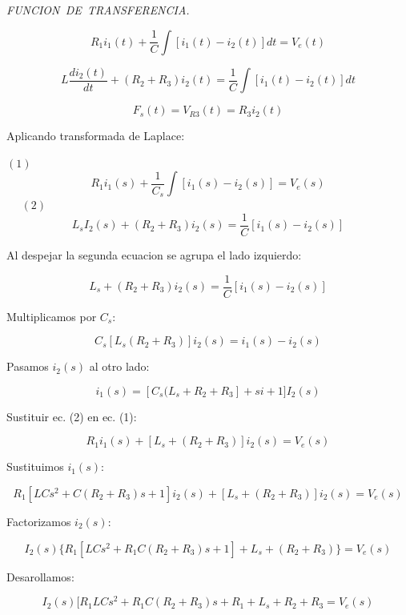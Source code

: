 \documentclass{article}
\begin{document}
\emph{FUNCION\ DE\ TRANSFERENCIA.}

\[
R_{1}i_{1}\left( t\right) +\frac{1}{C}\int \left[ i_{1}\left( t\right)
-i_{2}\left( t\right) \right] dt=V_{e}\left( t\right) 
\]

\[
L\frac{di_{2}\left( t\right) }{dt}+\left( R_{2}+R_{3}\right) i_{2}\left(
t\right) =\frac{1}{C}\int \left[ i_{1}\left( t\right) -i_{2}\left( t\right) %
\right] dt 
\]

\[
F_{s}\left( t\right) =V_{R3}\left( t\right) =R_{3}i_{2}\left( t\right) 
\]

\bigskip Aplicando transformada de Laplace:

$\left( 1\right) $%
\[
R_{1}i_{1}\left( s\right) +\frac{1}{C_{s}}\int \left[ i_{1}\left( s\right)
-i_{2}\left( s\right) \right] =V_{e}\left( s\right) 
\]
$\ \ \ \ \ \ \left( 2\right) $%
\[
L_{s}I_{2}\left( s\right) +\left( R_{2}+R_{3}\right) i_{2}\left( s\right) =%
\frac{1}{C}\left[ i_{1}\left( s\right) -i_{2}\left( s\right) \right] 
\]

Al despejar la segunda ecuacion se agrupa el lado izquierdo:

\[
L_{s}+\left( R_{2}+R_{3}\right) i_{2}\left( s\right) =\frac{1}{C}\left[
i_{1}\left( s\right) -i_{2}\left( s\right) \right] 
\]

Multiplicamos por $C_{s}:$

\[
C_{s}[L_{s}\left( R_{2}+R_{3}\right) ]i_{2}\left( s\right) =i_{1}\left(
s\right) -i_{2}\left( s\right) 
\]

Pasamos $i_{2}\left( s\right) $ al otro lado:

\[
i_{1}\left( s\right) =[C_{s}(L_{s}+R_{2}+R_{3}]+si+1]I_{2}\left( s\right) 
\]

Sustituir ec. (2) en ec. (1):

\bigskip

\[
R_{1}i_{1}\left( s\right) +[L_{s}+\left( R_{2}+R_{3}\right) ]i_{2}\left(
s\right) =V_{e}\left( s\right) 
\]

Sustituimos $i_{1}\left( s\right) :$

\[
R_{1}[LCs^{2}+C(R_{2}+R_{3})s+1]i_{2}\left( s\right) +[L_{s}+\left(
R_{2}+R_{3}\right) ]i_{2}\left( s\right) =V_{e}\left( s\right) 
\]

Factorizamos $i_{2}\left( s\right) :$

\[
I_{2}(s)\{R_{1}[LCs^{2}+R_{1}C(R_{2}+R_{3})s+1]+L_{s}+\left(
R_{2}+R_{3}\right) \}=V_{e}\left( s\right) 
\]

Desarollamos:

\[
I_{2}(s)[R_{1}LCs^{2}+R_{1}C(R_{2}+R_{3})s+R_{1}+L_{s}+R_{2}+R_{3}=V_{e}%
\left( s\right) 
\]
\end{document}
